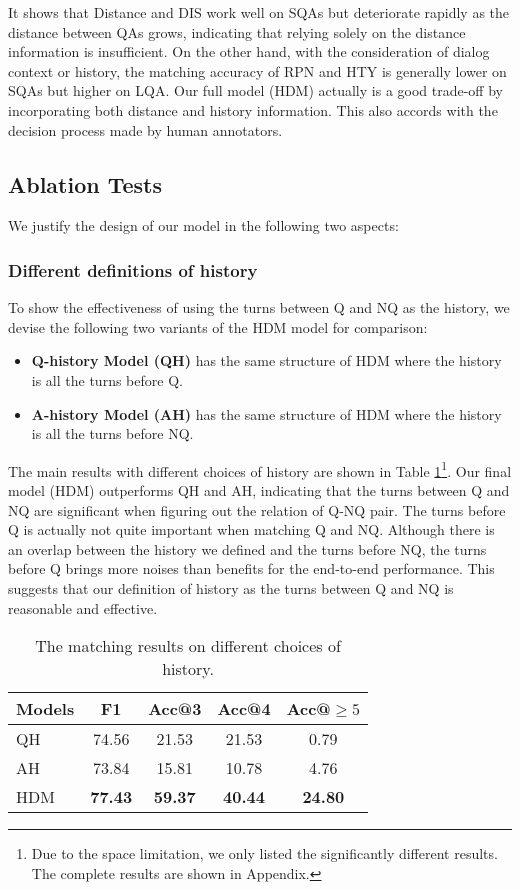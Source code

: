 It shows that Distance and DIS work well on SQAs but deteriorate rapidly 
as the distance between QAs grows, indicating that relying solely on 
the distance information is insufficient. 
On the other hand, with the consideration of dialog context or history, 
the matching accuracy of RPN and HTY is generally lower on SQAs but higher on 
LQA. Our full model (HDM) actually is a good trade-off 
by incorporating both distance and history information. This also accords 
with the decision process made by human annotators.

\subsection{Ablation Tests}
We justify the design of our model in the following two aspects:

\subsubsection*{Different definitions of history}

To show the effectiveness of using the turns between Q and NQ 
as the history, we devise the following two variants of the HDM model 
for comparison:
\begin{itemize}
	\item \textbf{Q-history Model (QH)} has the same structure of HDM where the history is all the turns before Q.
	\item \textbf{A-history Model (AH)} has the same structure of HDM where the history is all the turns before NQ. 
\end{itemize}

The main results with different choices of history are shown in Table \ref{tab:historychoice}\footnote{Due to the space limitation, we only listed the significantly different results. The complete results are shown in Appendix.}. Our final model (HDM) outperforms QH and AH, indicating that the turns between Q and NQ are significant when figuring out the relation of Q-NQ pair. The turns before Q is actually not quite important when matching Q and NQ. 
Although there is an overlap between the history we defined and 
the turns before NQ, 
the turns before Q brings more noises than benefits for
the end-to-end performance. This suggests that our definition of 
history as the turns between Q and NQ is reasonable and effective.

\begin{table}[th]
	\small
	\centering
	\begin{tabular}{p{1.5cm}<{\centering}|c|ccc}
		\toprule[1.3pt]
		Models &F1&Acc@3&Acc@4&Acc@$\geq5$\\
		\midrule[1pt]
		QH&74.56&21.53&21.53&0.79 \\	
		AH&73.84&15.81&10.78&4.76 \\
		HDM&\textbf{77.43}&\textbf{59.37}&\textbf{40.44}&\textbf{24.80}\\
		\bottomrule[1.3pt]
	\end{tabular}
	\caption{The matching results on different choices of history.}
	\label{tab:historychoice}
\end{table}

